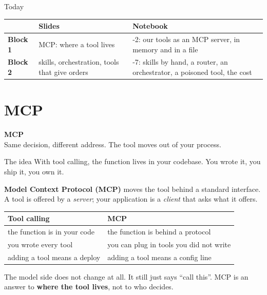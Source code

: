 \documentclass[aspectratio=169]{beamer}
\newcommand{\keybox}[1]{%
  \begin{tcolorbox}[colback=armblue!8, colframe=armblue, boxrule=0.6pt, arc=2pt]
  #1
  \end{tcolorbox}}
\newcommand{\sectiontransition}[2]{%
  \begin{frame}[plain]
    \vfill
    \begin{center}
      {\Huge\bfseries\color{popblue} #1}\\[1.1em]
      {\large #2}
    \end{center}
    \vfill
  \end{frame}}
\begin{document}
\begin{frame}{Today}
  \vspace{0.6em}
  \begin{center}
  \small
  \begin{tabular}{l>{\raggedright\arraybackslash}p{}>{\raggedright\arraybackslash}p{}}
    \toprule
    & \textbf{Slides} & \textbf{Notebook} \\
    \midrule
    \textbf{Block 1} & MCP: where a tool lives & 1-2: our tools as an MCP server, in memory and in a file \\[0.3em]
    \textbf{Block 2} & skills, orchestration, tools that give orders
      & 3-7: skills by hand, a router, an orchestrator, a poisoned tool, the cost \\
    \bottomrule
  \end{tabular}
  \end{center}
\end{frame}

\section{MCP}
\sectiontransition{MCP}{Same decision, different address. The tool moves out of your process.}

\begin{frame}{The idea}
  \vspace{0.3em}
  With tool calling, the function lives in your codebase. You wrote it, you ship it, you own it.

  \vspace{0.4em}
  \textbf{Model Context Protocol (MCP)} moves the tool behind a standard interface. A tool is offered by a
  \emph{server}; your application is a \emph{client} that asks what it offers.

  \vspace{0.4em}
  \begin{center}
  \small
  \begin{tabular}{ll}
    \toprule
    \textbf{Tool calling} & \textbf{MCP} \\
    \midrule
    the function is in your code & the function is behind a protocol \\
    you wrote every tool & you can plug in tools you did not write \\
    adding a tool means a deploy & adding a tool means a config line \\
    \bottomrule
  \end{tabular}
  \end{center}

  \vspace{0.35em}
  \keybox{The model side does not change at all. It still just says ``call this''. MCP is an answer to
  \textbf{where the tool lives}, not to who decides.}
\end{frame}
\end{document}
